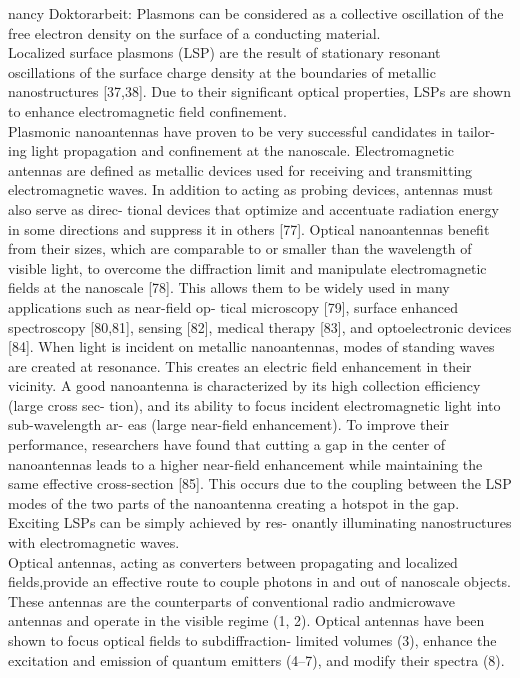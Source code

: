 	nancy Doktorarbeit:
	Plasmons can be considered as a collective oscillation of the free electron density on the surface of a conducting material.
	\\
	Localized surface plasmons (LSP) are the result of stationary resonant oscillations of the surface charge density at the boundaries of metallic nanostructures [37,38]. Due to their significant optical properties, LSPs are shown to enhance electromagnetic field confinement.
	\\
	Plasmonic nanoantennas have proven to be very successful candidates in tailor- ing light propagation and confinement at the nanoscale. Electromagnetic antennas are defined as metallic devices used for receiving and transmitting electromagnetic waves. In addition to acting as probing devices, antennas must also serve as direc- tional devices that optimize and accentuate radiation energy in some directions and suppress it in others [77]. Optical nanoantennas benefit from their sizes, which are comparable to or smaller than the wavelength of visible light, to overcome the diffraction limit and manipulate electromagnetic fields at the nanoscale [78]. This allows them to be widely used in many applications such as near-field op- tical microscopy [79], surface enhanced spectroscopy [80,81], sensing [82], medical therapy [83], and optoelectronic devices [84].
	When light is incident on metallic nanoantennas, modes of standing waves are created at resonance. This creates an electric field enhancement in their vicinity. A good nanoantenna is characterized by its high collection efficiency (large cross sec- tion), and its ability to focus incident electromagnetic light into sub-wavelength ar- eas (large near-field enhancement). To improve their performance, researchers have found that cutting a gap in the center of nanoantennas leads to a higher near-field enhancement while maintaining the same effective cross-section [85]. This occurs due to the coupling between the LSP modes of the two parts of the nanoantenna creating a hotspot in the gap.
	Exciting LSPs can be simply achieved by res- onantly illuminating nanostructures with electromagnetic waves.
	\\
	\cite{Curto2010}
	Optical antennas, acting as converters between propagating and localized fields,provide an effective route to couple photons in and out of nanoscale objects. These antennas are the counterparts of conventional radio andmicrowave antennas and operate in the visible regime (1, 2). Optical antennas have been shown to focus optical fields to subdiffraction- limited volumes (3), enhance the excitation and emission of quantum emitters (4–7), and modify their spectra (8). 
